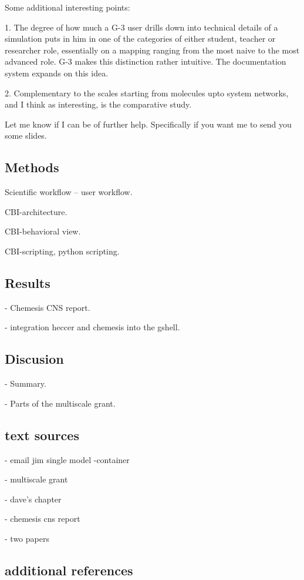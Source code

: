 \documentclass[12pt]{article}
\begin{document}
Some additional interesting points:

1. The degree of how much a G-3 user drills down into technical
details of a simulation puts in him in one of the categories of either
student, teacher or researcher role, essentially on a mapping ranging
from the most naive to the most advanced role.  G-3 makes this
distinction rather intuitive.  The documentation system expands on
this idea.

2. Complementary to the scales starting from molecules upto system
networks, and I think as interesting, is the comparative study.

Let me know if I can be of further help.  Specifically if you want me
to send you some slides.

\subsection*{Methods}

Scientific workflow -- user workflow.

CBI-architecture.

CBI-behavioral view.

CBI-scripting, python scripting.


\subsection*{Results}

- Chemesis CNS report.

- integration heccer and chemesis into the gshell.


\subsection*{Discusion}

- Summary.

- Parts of the multiscale grant.


\subsection*{text sources}

- email jim single model -container

- multiscale grant

- dave's chapter

- chemesis cns report

- two papers


\subsection*{additional references}
\end{document}

